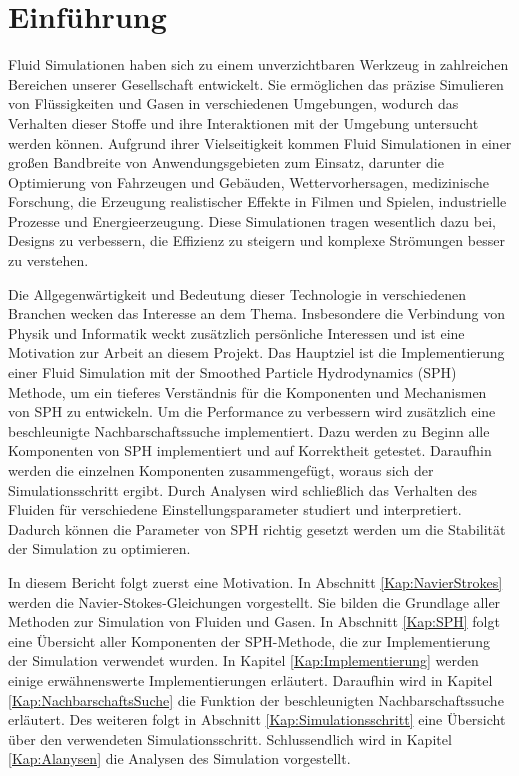 \documentclass[a4paper, 12pt]{article}
\begin{document}
\onehalfspacing
\makeTitleAndTable

\section{Einführung}
Fluid Simulationen haben sich zu einem unverzichtbaren Werkzeug in zahlreichen Bereichen unserer Gesellschaft entwickelt. Sie ermöglichen das präzise Simulieren von Flüssigkeiten und Gasen in verschiedenen Umgebungen, wodurch das Verhalten dieser Stoffe und ihre Interaktionen mit der Umgebung untersucht werden können. Aufgrund ihrer Vielseitigkeit kommen Fluid Simulationen in einer großen Bandbreite von Anwendungsgebieten zum Einsatz, darunter die Optimierung von Fahrzeugen und Gebäuden, Wettervorhersagen, medizinische Forschung, die Erzeugung realistischer Effekte in Filmen und Spielen, industrielle Prozesse und Energieerzeugung. Diese Simulationen tragen wesentlich dazu bei, Designs zu verbessern, die Effizienz zu steigern und komplexe Strömungen besser zu verstehen.

Die Allgegenwärtigkeit und Bedeutung dieser Technologie in verschiedenen Branchen wecken das Interesse an dem Thema. Insbesondere die Verbindung von Physik und Informatik weckt zusätzlich persönliche Interessen und ist eine Motivation zur Arbeit an diesem Projekt. Das Hauptziel ist die Implementierung einer Fluid Simulation mit der Smoothed Particle Hydrodynamics (SPH) Methode, um ein tieferes Verständnis für die Komponenten und Mechanismen von SPH zu entwickeln. Um die Performance zu verbessern wird zusätzlich eine beschleunigte Nachbarschaftssuche implementiert. 
Dazu werden zu Beginn alle Komponenten von SPH implementiert und auf Korrektheit getestet. Daraufhin werden die einzelnen Komponenten zusammengefügt, woraus sich der Simulationsschritt ergibt. Durch Analysen wird schließlich das Verhalten des Fluiden für verschiedene Einstellungsparameter studiert und interpretiert. Dadurch können die Parameter von SPH richtig gesetzt werden um die Stabilität der Simulation zu optimieren.

In diesem Bericht folgt zuerst eine Motivation. In Abschnitt \ref{Kap:NavierStrokes} werden die Navier-Stokes-Gleichungen vorgestellt. Sie bilden die Grundlage aller Methoden zur Simulation von Fluiden und Gasen. In Abschnitt \ref{Kap:SPH} folgt eine Übersicht aller Komponenten der SPH-Methode, die zur Implementierung der Simulation verwendet wurden. In Kapitel \ref{Kap:Implementierung} werden einige erwähnenswerte Implementierungen erläutert. Daraufhin wird in Kapitel \ref{Kap:NachbarschaftsSuche} die Funktion der beschleunigten Nachbarschaftssuche erläutert. Des weiteren folgt in Abschnitt \ref{Kap:Simulationsschritt} eine Übersicht über den verwendeten Simulationsschritt. Schlussendlich wird in Kapitel \ref{Kap:Alanysen} die Analysen des Simulation vorgestellt.
\end{document}
